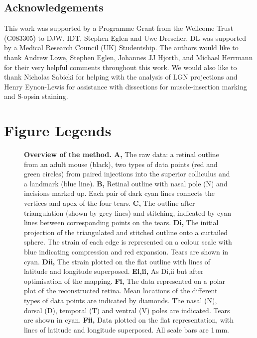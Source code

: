 \documentclass[10pt]{article}
\newcounter{Figure}
\begin{document}
\subsection*{Acknowledgements}
This work was supported by a Programme Grant from the Wellcome Trust
(G083305) to DJW, IDT,  Stephen Eglen and Uwe Drescher. DL was
supported by a Medical Research Council (UK) Studentship. The authors
would like to thank Andrew Lowe, Stephen Eglen, Johannes JJ Hjorth,
and Michael Herrmann for their very helpful comments throughout this
work. We would also like to thank Nicholas Sabicki for helping with
the analysis of LGN projections and Henry Eynon-Lewis for assistance
with dissections for muscle-insertion marking and S-opsin staining.
\clearpage\section*{Figure Legends}
\begin{figure}[!ht]\caption{
\textbf{Overview of the method. A,} The raw data: a retinal
outline from an adult mouse (black), two types of data points (red
and green circles) from paired injections into the superior
colliculus and a landmark (blue line). \textbf{B, }Retinal outline
with nasal pole (N) and incisions marked up. Each pair of dark cyan
lines connects the vertices and apex of the four tears. \textbf{C,}
The outline after triangulation (shown by grey lines) and stitching,
indicated by cyan lines between corresponding points on the tears.
\textbf{Di,} The initial projection of the triangulated and stitched
outline onto a curtailed sphere. The strain of each edge is
represented on a colour scale with blue indicating compression and
red expansion. Tears are shown in cyan. \textbf{Dii,} The strain
plotted on the flat outline with lines of latitude and longitude
superposed. \textbf{Ei,ii,} As Di,ii but after optimisation of the
mapping. \textbf{Fi,} The data represented on a polar plot of the
reconstructed retina. Mean locations of the different types of data
points are indicated by  diamonds. The nasal (N), dorsal (D),
temporal (T) and ventral (V) poles are indicated. Tears are shown in
cyan. \textbf{Fii,} Data plotted on the flat representation, with
lines of latitude and longitude superposed. All scale bars are 1\,mm.
}\end{figure}
\end{document}

